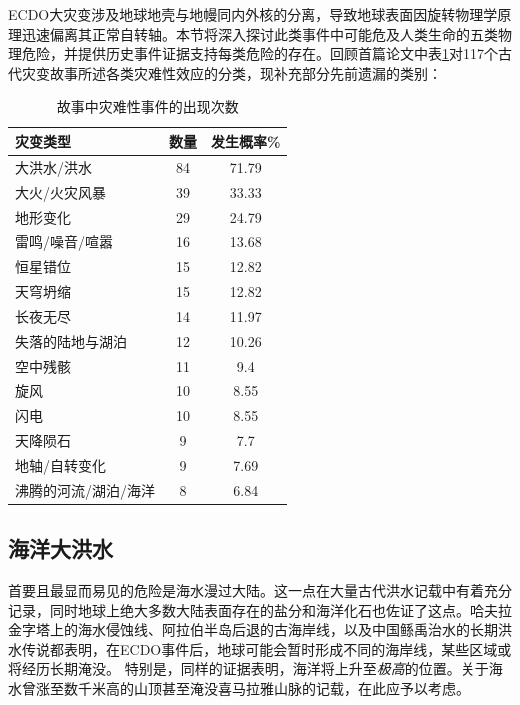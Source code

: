 \documentclass[10pt,twocolumn,letterpaper]{article}
\begin{document}
ECDO大灾变涉及地球地壳与地幔同内外核的分离，导致地球表面因旋转物理学原理迅速偏离其正常自转轴\cite{1}。本节将深入探讨此类事件中可能危及人类生命的五类物理危险，并提供历史事件证据支持每类危险的存在。回顾首篇论文中表\ref{tab: 1}对117个古代灾变故事所述各类灾难性效应的分类，现补充部分先前遗漏的类别：

\begin{table}[ht]
\begin{center}
\renewcommand{\arraystretch}{1.2}  %
\begin{tabular}{|l|c|c|}
\hline
\textbf{灾变类型} & \textbf{数量} & \textbf{发生概率\%} \\
\hline\hline
大洪水/洪水            & 84 & 71.79 \\
大火/火灾风暴          & 39 & 33.33 \\
地形变化               & 29 & 24.79 \\
雷鸣/噪音/喧嚣         & 16 & 13.68 \\
恒星错位     & 15 & 12.82 \\
天穹坍缩           & 15 & 12.82 \\
长夜无尽          & 14 & 11.97 \\
失落的陆地与湖泊    & 12 & 10.26 \\
空中残骸           & 11 & 9.4   \\
旋风                  & 10 & 8.55  \\
闪电                  & 10 & 8.55  \\
天降陨石              & 9 & 7.7 \\
地轴/自转变化         & 9 & 7.69  \\
沸腾的河流/湖泊/海洋  & 8 & 6.84 \\
\hline
\end{tabular}
\end{center}
\caption{故事中灾难性事件的出现次数 \cite{12}}
\label{tab: 1}
\end{table}

\subsection{海洋大洪水}

首要且最显而易见的危险是海水漫过大陆\cite{3}。这一点在大量古代洪水记载中有着充分记录，同时地球上绝大多数大陆表面存在的盐分和海洋化石也佐证了这点。哈夫拉金字塔上的海水侵蚀线、阿拉伯半岛后退的古海岸线\cite{1}，以及中国鲧禹治水的长期洪水传说都表明，在ECDO事件后，地球可能会暂时形成不同的海岸线，某些区域或将经历长期淹没。
特别是，同样的证据表明，海洋将上升至\textit{极高}的位置。关于海水曾涨至数千米高的山顶甚至淹没喜马拉雅山脉的记载，在此应予以考虑。
\end{document}

